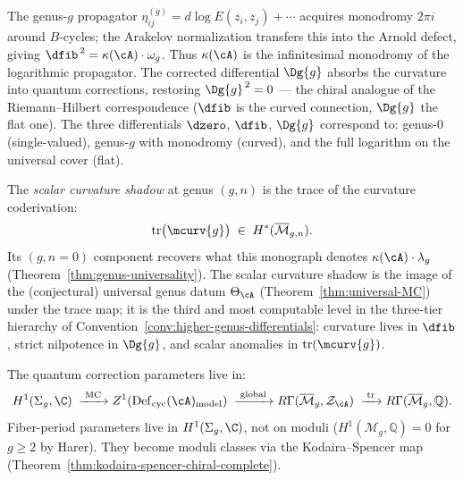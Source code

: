 \begin{remark}
\label{rem:curvature-riemann-hilbert}
The genus-$g$ propagator $\eta_{ij}^{(g)}=d\log E(z_i,z_j)+\cdots$
acquires monodromy $2\pi i$ around $B$-cycles; the Arakelov
normalization transfers this into the Arnold defect, giving
$\dfib^{\,2}=\kappa(\cA)\cdot\omega_g$.
Thus $\kappa(\cA)$ is the infinitesimal monodromy of the logarithmic
propagator.  The corrected differential $\Dg{g}$ absorbs the curvature
into quantum corrections, restoring $\Dg{g}^{\,2}=0$ --- the chiral
analogue of the Riemann--Hilbert correspondence ($\dfib$ is the curved
connection, $\Dg{g}$ the flat one).
The three differentials $\dzero$, $\dfib$, $\Dg{g}$ correspond to:
genus-$0$ (single-valued), genus-$g$ with monodromy (curved),
and the full logarithm on the universal cover (flat).
\end{remark}

\begin{definition}
\label{def:scalar-curvature-shadow}
The \emph{scalar curvature shadow} at genus $(g,n)$ is the trace of
the curvature coderivation:
\[
\mathrm{tr}\bigl(\mcurv{g}\bigr) \;\in\; H^*(\overline{\mathcal{M}}_{g,n}).
\]
Its $(g, n{=}0)$ component recovers what this monograph denotes
$\kappa(\cA) \cdot \lambda_g$
(Theorem~\ref{thm:genus-universality}).
The scalar curvature shadow is the image of the (conjectural)
universal genus datum $\Theta_{\cA}$
(Theorem~\ref{thm:universal-MC}) under the trace map; it is
the third and most computable level in the three-tier hierarchy of
Convention~\ref{conv:higher-genus-differentials}: curvature lives in
$\dfib$, strict nilpotence in $\Dg{g}$, and scalar anomalies in
$\mathrm{tr}(\mcurv{g})$.
\end{definition}

\begin{remark}\label{rem:parameter-source}
The quantum correction parameters live in:
\[
H^1(\Sigma_g, \C)
\;\xrightarrow{\;\text{MC}\;}
Z^1(\operatorname{Def}_{\mathrm{cyc}}(\cA)_{\mathrm{model}})
\;\xrightarrow{\;\text{global}\;}
R\Gamma(\overline{\mathcal{M}}_g, \mathcal{Z}_{\cA})
\;\xrightarrow{\;\mathrm{tr}\;}
R\Gamma(\overline{\mathcal{M}}_g, \mathbb{Q}).
\]
Fiber-period parameters live in $H^1(\Sigma_g,\C)$, not on moduli
($H^1(\mathcal{M}_g,\mathbb{Q})=0$ for $g\geq 2$ by Harer).
They become moduli classes via the Kodaira--Spencer map
(Theorem~\ref{thm:kodaira-spencer-chiral-complete}).
\end{remark}

